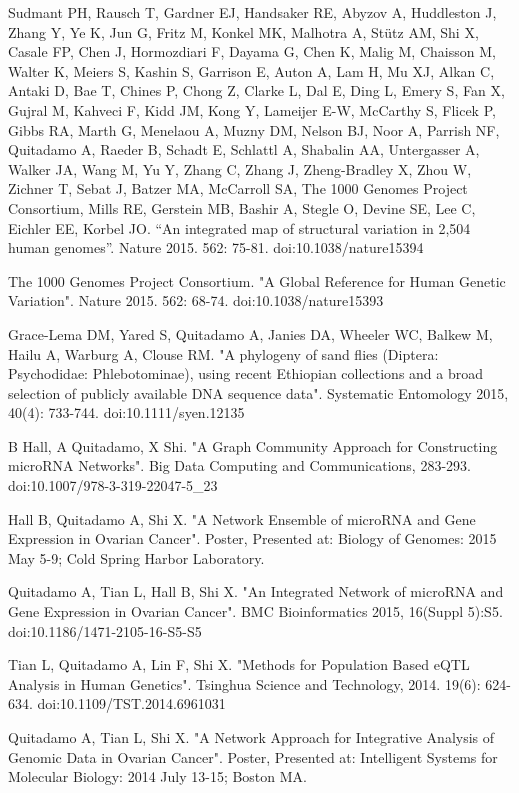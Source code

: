 \documentclass[margin,line]{res}
\begin{document}
\begin{resume}
Sudmant PH, Rausch T, Gardner EJ, Handsaker RE, Abyzov A, Huddleston J, Zhang Y, Ye K, Jun G, Fritz M, Konkel MK, Malhotra A, Stütz AM, Shi X, Casale FP, Chen J, Hormozdiari F, Dayama G, Chen K, Malig M, Chaisson M, Walter K, Meiers S, Kashin S, Garrison E, Auton A, Lam H, Mu XJ, Alkan C, Antaki D, Bae T, Chines P, Chong Z, Clarke L, Dal E, Ding L, Emery S, Fan X, Gujral M, Kahveci F, Kidd JM, Kong Y, Lameijer E-W, McCarthy S, Flicek P, Gibbs RA, Marth G, Menelaou A, Muzny DM, Nelson BJ, Noor A, Parrish NF, Quitadamo A, Raeder B, Schadt E, Schlattl A, Shabalin AA, Untergasser A, Walker JA, Wang M, Yu Y, Zhang C, Zhang J, Zheng-Bradley X, Zhou W, Zichner T, Sebat J, Batzer MA, McCarroll SA, The 1000 Genomes Project Consortium, Mills RE, Gerstein MB, Bashir A, Stegle O, Devine SE, Lee C, Eichler EE, Korbel JO. “An integrated map of structural variation in 2,504 human genomes”. Nature 2015. 562: 75-81. doi:10.1038/nature15394

The 1000 Genomes Project Consortium. "A Global Reference for Human Genetic Variation". Nature 2015. 562: 68-74. doi:10.1038/nature15393

Grace-Lema DM, Yared S, Quitadamo A, Janies DA, Wheeler WC, Balkew M, Hailu A, Warburg A, Clouse RM. "A phylogeny of sand flies (Diptera: Psychodidae: Phlebotominae), using recent Ethiopian collections and a broad selection of publicly available DNA sequence data". Systematic Entomology 2015, 40(4): 733-744. doi:10.1111/syen.12135

B Hall, A Quitadamo, X Shi. "A Graph Community Approach for Constructing microRNA Networks". Big Data Computing and Communications, 283-293. doi:10.1007/978-3-319-22047-5\_23


Hall B, Quitadamo A, Shi X. "A Network Ensemble of microRNA and Gene Expression in Ovarian Cancer". Poster, Presented at: Biology of Genomes: 2015 May 5-9; Cold Spring Harbor Laboratory. 

Quitadamo A, Tian L, Hall B, Shi X. "An Integrated Network of microRNA and Gene Expression in Ovarian Cancer". BMC Bioinformatics 2015, 16(Suppl 5):S5. doi:10.1186/1471-2105-16-S5-S5

Tian L, Quitadamo A, Lin F, Shi X. "Methods for Population Based eQTL Analysis in Human Genetics". Tsinghua Science and Technology, 2014. 19(6): 624-634. doi:10.1109/TST.2014.6961031

Quitadamo A, Tian L, Shi X. "A Network Approach for Integrative Analysis of Genomic Data in Ovarian Cancer". Poster, Presented at: Intelligent Systems for Molecular Biology: 2014 July 13-15; Boston MA.


\end{resume}
\end{document}
